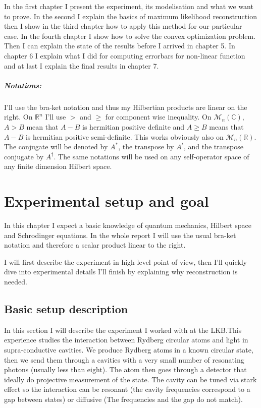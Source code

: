 \documentclass[10pt]{report}
\theoremstyle{plain}
\theoremstyle{definition}
\theoremstyle{remark}
\newcommand{\R}{\ensuremath{\mathbb{R}}}
\newcommand{\C}{\ensuremath{\mathbb{C}}}
\renewcommand{\geq}{\geqslant}
\begin{document}
In the first chapter I
present the experiment, its modelisation and what we want to prove. In the
second I explain the basics of maximum likelihood reconstruction then I show in
the third chapter how to apply this method for our particular case. In the
fourth chapter I show how to solve the convex optimization problem. Then I can
explain the state of the results before I arrived in chapter 5. In chapter 6 I
explain what I did for computing errorbars for non-linear function and at last
I explain the final results in chapter 7.

\vfill

\paragraph{Notations:} I'll use the bra-ket notation and thus my Hilbertian
products are linear on the right. On $\R^n$ I'll use $>$ and $\geq$ for
component wise inequality. On $\mathcal{M}_n(\C)$, $A > B$ mean that $A-B$ is hermitian
positive definite and $A \geq B$ means that $A - B$ is hermitian positive
semi-definite. This works obviously also on $\mathcal{M}_n(\R)$. The conjugate will be
denoted by $A^*$, the transpose by $A^t$, and the transpose conjugate by
$A^\dagger$. The same notations will be used on any self-operator space of any finite dimension
Hilbert space.


\chapter{Experimental setup and goal}

In this chapter I expect a basic knowledge of quantum mechanics, Hilbert space and
Schrodinger equations. In the whole report I will use the usual bra-ket notation
and therefore a scalar product linear to the right.

I will first describe the experiment in high-level point of view, then I'll
quickly dive into experimental details I'll finish by explaining why
reconstruction is needed.

\section{Basic setup description}

In this section I will describe the experiment I worked with at the LKB.\@ This
experience studies the interaction between Rydberg circular atoms and light in
supra-conductive cavities.
We produce Rydberg atoms in a known circular state, then we send them through a
cavities with a very small number of resonating photons (usually less than
eight). The atom then goes through a detector that ideally do projective
measurement of the state. The cavity can be tuned via stark effect so the
interaction can be resonant (the cavity frequencies correspond to a gap between
states) or diffusive (The frequencies and the gap do not match).
\end{document}
